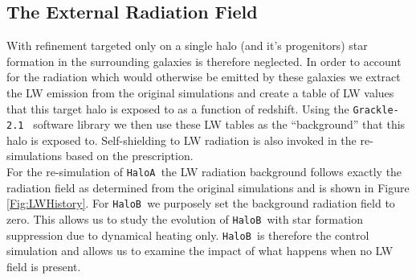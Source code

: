 \documentclass[graphics, twocolumn, usenatbib]{mn2e}
\newcommand{\grackle}{\texttt{Grackle-2.1~}}
\newcommand{\ha} {\texttt{HaloA~}}
\newcommand{\hb} {\texttt{HaloB~}}
\begin{document}
 \subsection{The External Radiation Field} \label{Sec:LWRadField}
 With refinement targeted only on a single halo (and it's progenitors) star formation in the surrounding galaxies is therefore neglected. In order to account for the radiation which would otherwise be emitted by these galaxies we extract the LW emission from the original simulations and create a table of LW values that this target halo is exposed to as a function of
 redshift. Using the \grackle \citep{Grackle} software library we then use these LW tables as the ``background'' that this halo is exposed to. Self-shielding to LW radiation is also invoked in the re-simulations based on the \cite{Wolcott-Green_2011} prescription.\\
 \indent For the re-simulation of \ha the LW radiation background follows exactly
 the radiation field as determined from the original simulations and is shown
 in Figure \ref{Fig:LWHistory}. For \hb we purposely set the background radiation field to zero. This allows us to study the evolution of \hb with 
 star formation suppression due to dynamical heating only. \hb is therefore the 
 control simulation and allows us to examine the impact of what happens when
 no LW field is present. 
 
\end{document}
